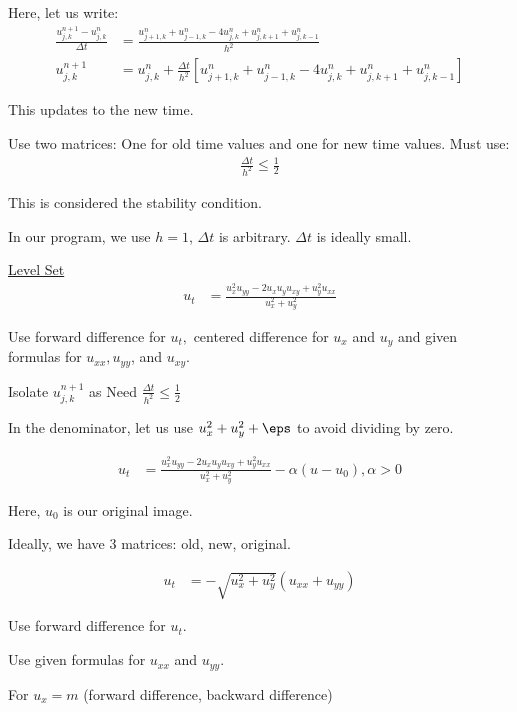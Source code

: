 Here, let us write:
%
\begin{align}
  \frac{u^{n + 1}_{j, k} - u^n_{j, k}}{\Delta t}
  & =
  \frac{u^n_{j+1, k} + u^n_{j-1, k} - 4u^n_{j, k} + u^n_{j, k+1} + u^n_{j, k - 1}}{h^2}\\
  u^{n + 1}_{j, k}
  & = u^n_{j, k} + \frac{\Delta t}{h^2}
  \left[
    u^n_{j+1, k} + u^n_{j - 1, k} - 4u^n_{j, k} + u^n_{j, k+1} + u^n_{j, k -1}
  \right]
\end{align}

This updates to the new time.

Use two matrices: One for old time values and one for new time values. Must use:
%
\begin{align}
  \frac{\Delta t}{h^2} \leq \frac{1}{2}
\end{align}

This is considered the stability condition.

In our program, we use $h = 1$, $\Delta t$ is arbitrary. $\Delta t$ is ideally small.

\underline{Level Set}
%
\begin{align}
  u_t & = \frac{u^2_x u_{yy} - 2 u_x u_y u_{xy} + u^2_yu_{xx}}{u^2_x + u^2_y}
\end{align}

Use forward difference for $u_t,$ centered difference for $u_x$ and $u_y$ and given formulas for $u_{xx}, u_{yy}$, and $u_{xy}$.

Isolate $u^{n + 1}_{j, k}$ as
Need $\frac{\Delta t}{h^2} \leq \frac{1}{2}$

In the denominator, let us use $u^2_x + u^2_y + \eps$ to avoid dividing by zero.

%
\begin{align}
  u_t
  & = \frac
  {u^2_x u_{yy} - 2 u_x u_y u_{xy} + u^2_y u_{xx}}
  {u^2_x + u^2_y} - \alpha(u - u_0),  \alpha > 0
\end{align}

Here, $u_0$ is our original image.

Ideally, we have 3 matrices: old, new, original.

%
\begin{align}
  u_t & = -\sqrt{u^2_x + u^2_y} (u_{xx} + u_{yy})
\end{align}

Use forward difference for $u_t$.

Use given formulas for $u_{xx}$ and $u_{yy}$.

For $u_x = m$ (forward difference, backward difference) %

